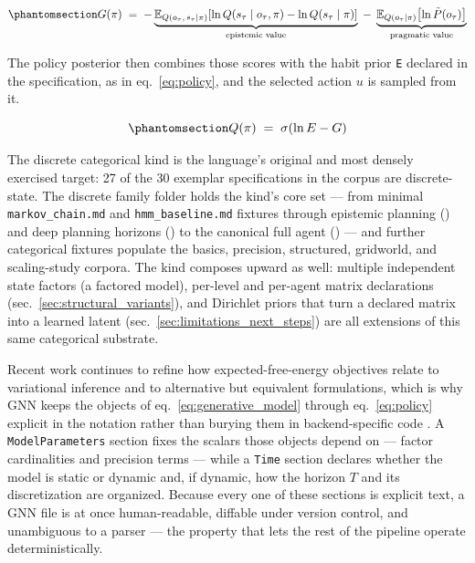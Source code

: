 \documentclass[
  english,
  9pt,
]{extarticle}
\begin{document}
\begin{equation}\protect\phantomsection\label{eq:efe}{
G(\pi) \;=\; -\underbrace{\mathbb{E}_{Q(o_\tau,\, s_\tau \mid \pi)}\!\left[\ln Q(s_\tau \mid o_\tau, \pi) - \ln Q(s_\tau \mid \pi)\right]}_{\text{epistemic value}} \;-\; \underbrace{\mathbb{E}_{Q(o_\tau \mid \pi)}\!\left[\ln \tilde{P}(o_\tau)\right]}_{\text{pragmatic value}}
}\end{equation}

The policy posterior then combines those scores with the habit prior
\texttt{E} declared in the specification, as in eq.~\ref{eq:policy}, and
the selected action \(u\) is sampled from it.

\begin{equation}\protect\phantomsection\label{eq:policy}{
Q(\pi) \;=\; \sigma\!\left(\ln E - G\right)
}\end{equation}

The discrete categorical kind is the language's original and most
densely exercised target: 27 of the 30 exemplar specifications in the
corpus are discrete-state. The discrete family folder holds the kind's
core set --- from minimal \texttt{markov\_chain.md} and
\texttt{hmm\_baseline.md} fixtures through epistemic planning
() and deep planning horizons
() to the canonical full agent
() --- and further categorical fixtures
populate the basics, precision, structured, gridworld, and scaling-study
corpora. The kind composes upward as well: multiple independent state
factors (a factored model), per-level and per-agent matrix declarations
(sec.~\ref{sec:structural_variants}), and Dirichlet priors that turn a
declared matrix into a learned latent
(sec.~\ref{sec:limitations_next_steps}) are all extensions of this same
categorical substrate.

Recent work continues to refine how expected-free-energy objectives
relate to variational inference and to alternative but equivalent
formulations, which is why GNN keeps the objects of
eq.~\ref{eq:generative_model} through eq.~\ref{eq:policy} explicit in
the notation rather than burying them in backend-specific code
\citep{champion2024reframingEfe, nuijten2026typeInference, nuijten2026efePlanningVariational}.
A \texttt{ModelParameters} section fixes the scalars those objects
depend on --- factor cardinalities and precision terms --- while a
\texttt{Time} section declares whether the model is static or dynamic
and, if dynamic, how the horizon \(T\) and its discretization are
organized. Because every one of these sections is explicit text, a GNN
file is at once human-readable, diffable under version control, and
unambiguous to a parser --- the property that lets the rest of the
pipeline operate deterministically.
\end{document}
